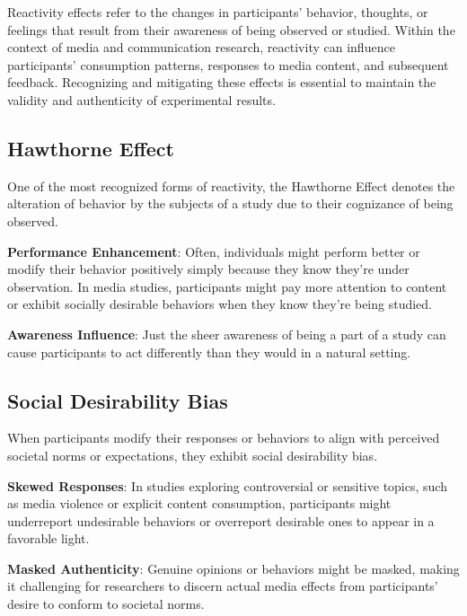 \documentclass[
  b5paper]{book}
\begin{document}
Reactivity effects refer to the changes in participants' behavior, thoughts, or feelings that result from their awareness of being observed or studied. Within the context of media and communication research, reactivity can influence participants' consumption patterns, responses to media content, and subsequent feedback. Recognizing and mitigating these effects is essential to maintain the validity and authenticity of experimental results.

\hypertarget{hawthorne-effect}{%
\subsection*{Hawthorne Effect}\label{hawthorne-effect}}

One of the most recognized forms of reactivity, the Hawthorne Effect denotes the alteration of behavior by the subjects of a study due to their cognizance of being observed.

\textbf{Performance Enhancement}: Often, individuals might perform better or modify their behavior positively simply because they know they're under observation. In media studies, participants might pay more attention to content or exhibit socially desirable behaviors when they know they're being studied.

\textbf{Awareness Influence}: Just the sheer awareness of being a part of a study can cause participants to act differently than they would in a natural setting.

\hypertarget{social-desirability-bias}{%
\subsection*{Social Desirability Bias}\label{social-desirability-bias}}

When participants modify their responses or behaviors to align with perceived societal norms or expectations, they exhibit social desirability bias.

\textbf{Skewed Responses}: In studies exploring controversial or sensitive topics, such as media violence or explicit content consumption, participants might underreport undesirable behaviors or overreport desirable ones to appear in a favorable light.

\textbf{Masked Authenticity}: Genuine opinions or behaviors might be masked, making it challenging for researchers to discern actual media effects from participants' desire to conform to societal norms.
\end{document}
